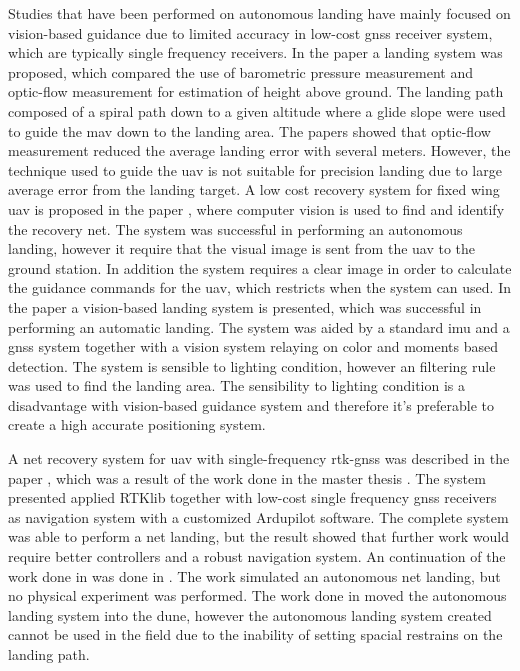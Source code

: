 Studies that have been performed on autonomous landing have mainly focused on vision-based guidance due to limited accuracy in low-cost \gls{gnss} receiver system, which are typically single frequency receivers. In the paper \citep{barber2007autonomous} a landing system was proposed, which compared the use of barometric pressure measurement and optic-flow measurement for estimation of height above ground. The landing path composed of a spiral path down to a given altitude where a glide slope were used to guide the \acrfull{mav} down to the landing area. The papers showed that optic-flow measurement reduced the average landing error with several meters. However, the technique used to guide the \gls{uav} is not suitable for precision landing due to large average error from the landing target. A low cost recovery system for fixed wing \gls{uav} is proposed in the paper \citep{kim2013fully}, where computer vision is used to find and identify the recovery net. The system was successful in performing an autonomous landing, however it require that the visual image is sent from the \gls{uav} to the ground station. In addition the system requires a clear image in order to calculate the guidance commands for the \gls{uav}, which restricts when the system can used. In the paper \citep{huh2010vision} a vision-based landing system is presented, which was successful in performing an automatic landing. The system was aided by a standard \gls{imu} and a \gls{gnss} system together with a vision system relaying on color and moments based detection. The system is sensible to lighting condition, however an filtering rule was used to find the landing area. The sensibility to lighting condition is a disadvantage with vision-based guidance system and therefore it's preferable to create a high accurate positioning system.

A net recovery system for \gls{uav} with single-frequency \acrfull{rtk-gnss} was described in the paper \citep{skulstad2015net}, which was a result of the work done in the master thesis \citep{Skulstad&Syversen}. The system presented applied RTKlib together with low-cost single frequency \gls{gnss} receivers as navigation system with a customized Ardupilot software. The complete system was able to perform a net landing, but the result showed that further work would require better controllers and a robust navigation system. An continuation of the work done in \citep{Skulstad&Syversen} was done in \citep{Froelich}. The work simulated an autonomous net landing, but no physical experiment was performed. The work done in \citep{Froelich} moved the autonomous landing system into the \gls{dune}, however the autonomous landing system created cannot be used in the field due to the inability of setting spacial restrains on the landing path.

